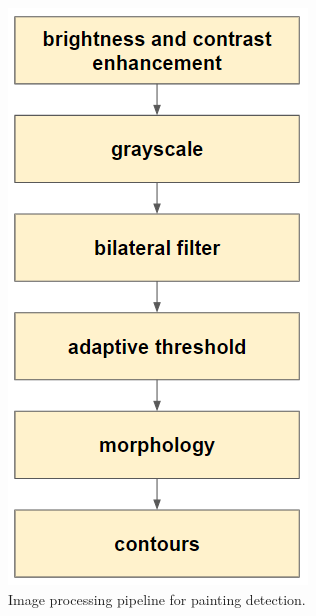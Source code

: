 \documentclass[10pt,twocolumn,letterpaper]{article}
\begin{document}
\begin{figure}[t]
\begin{center}
\includegraphics[width=0.5\linewidth]{images/image5.png}
\end{center}
\caption{Image processing pipeline for painting detection.}
\label{fig:PaintingDetectionPipeline}
\end{figure}
\end{document}
